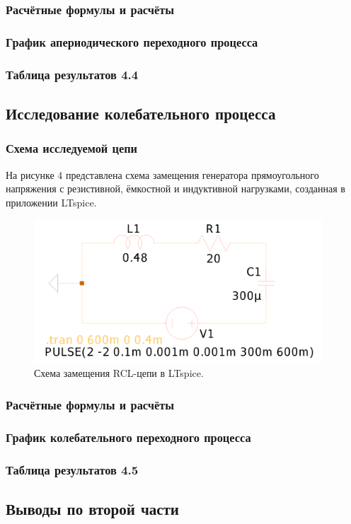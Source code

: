 \subsubsection{Расчётные формулы и расчёты}


\subsubsection{График апериодического переходного процесса}


\subsubsection{Таблица результатов 4.4}




\subsection{Исследование колебательного процесса}

\subsubsection{Схема исследуемой цепи}
На рисунке 4 представлена схема замещения генератора прямоугольного напряжения с резистивной, ёмкостной и индуктивной нагрузками, созданная в приложении LTspice.

\begin{figure}[H]
	\centering
	\includegraphics[width=0.96\textwidth]{./data/rcl_2-schema.png}
	\caption{Схема замещения RCL-цепи в LTspice.}
\end{figure}

\subsubsection{Расчётные формулы и расчёты}


\subsubsection{График колебательного переходного процесса}


\subsubsection{Таблица результатов 4.5}

\subsection{Выводы по второй части}
